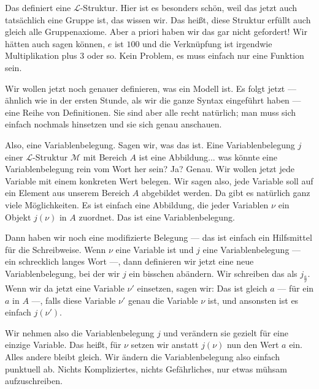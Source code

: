 \begin{spoken-clean}[00:50:03 - 00:52:25]
Das definiert eine $\mathcal{L}$-Struktur. Hier ist es besonders schön, weil das jetzt auch tatsächlich eine Gruppe ist, das wissen wir. Das heißt, diese Struktur erfüllt auch gleich alle Gruppenaxiome. Aber a priori haben wir das gar nicht gefordert! Wir hätten auch sagen können, $e$ ist $100$ und die Verknüpfung ist irgendwie Multiplikation plus $3$ oder so. Kein Problem, es muss einfach nur eine Funktion sein.

Wir wollen jetzt noch genauer definieren, was ein Modell ist. Es folgt jetzt --- ähnlich wie in der ersten Stunde, als wir die ganze Syntax eingeführt haben --- eine Reihe von Definitionen. Sie sind aber alle recht natürlich; man muss sich einfach nochmals hinsetzen und sie sich genau anschauen.

Also, eine Variablenbelegung. Sagen wir, was das ist. Eine Variablenbelegung $j$ einer $\mathcal{L}$-Struktur $\mathcal{M}$ mit Bereich $A$ ist eine Abbildung... was könnte eine Variablenbelegung rein vom Wort her sein? Ja? Genau. Wir wollen jetzt jede Variable mit einem konkreten Wert belegen. Wir sagen also, jede Variable soll auf ein Element aus unserem Bereich $A$ abgebildet werden. Da gibt es natürlich ganz viele Möglichkeiten. Es ist einfach eine Abbildung, die jeder Variablen $\nu$ ein Objekt $j(\nu)$ in $A$ zuordnet. Das ist eine Variablenbelegung.
\end{spoken-clean}

\begin{spoken-clean}[00:52:25 - 00:53:24]
Dann haben wir noch eine modifizierte Belegung --- das ist einfach ein Hilfsmittel für die Schreibweise. Wenn $\nu$ eine Variable ist und $j$ eine Variablenbelegung --- ein schrecklich langes Wort ---, dann definieren wir jetzt eine neue Variablenbelegung, bei der wir $j$ ein bisschen abändern. Wir schreiben das als $j_{\frac{a}{\nu}}$. Wenn wir da jetzt eine Variable $\nu'$ einsetzen, sagen wir: Das ist gleich $a$ --- für ein $a$ in $A$ ---, falls diese Variable $\nu'$ genau die Variable $\nu$ ist, und ansonsten ist es einfach $j(\nu')$.

Wir nehmen also die Variablenbelegung $j$ und verändern sie gezielt für eine einzige Variable. Das heißt, für $\nu$ setzen wir anstatt $j(\nu)$ nun den Wert $a$ ein. Alles andere bleibt gleich. Wir ändern die Variablenbelegung also einfach punktuell ab. Nichts Kompliziertes, nichts Gefährliches, nur etwas mühsam aufzuschreiben.
\end{spoken-clean}

